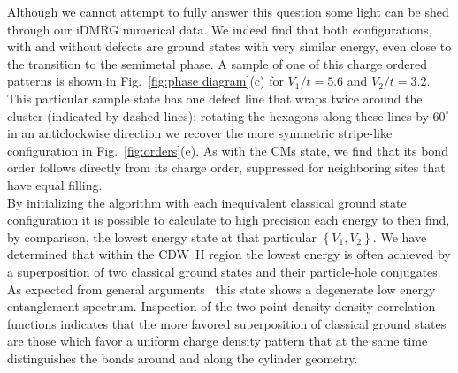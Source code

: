 \documentclass[aps,prx,10pt,twocolumn,floatfix,superscriptaddress,showpacs,numerical,footinbib]{revtex4-1}
\begin{document}
Although we cannot attempt to fully answer this question some light can be shed through our iDMRG numerical data. 
%
We indeed find that both configurations, with and without defects are ground states with very similar energy,
even close to the transition to the semimetal phase.
%
A sample of one of this charge ordered patterns is shown in Fig.~\ref{fig:phase diagram}(c) for $V_{1}/t=5.6$ and $V_{2}/t=3.2$.
%
This particular sample state has one defect line that wraps twice around the cluster (indicated by dashed lines); rotating the hexagons along these
lines by $60^{\circ}$ in an anticlockwise direction we recover the more symmetric stripe-like configuration in Fig.~\ref{fig:orders}(e).
%
As with the CMs state, we find that its bond order follows directly from its charge order, suppressed for neighboring sites that have
equal filling.\\
%
By initializing the algorithm with each inequivalent classical ground state configuration it is possible to calculate to high precision each 
energy to then find, by comparison, the lowest energy state at that particular $\left\lbrace V_{1},V_{2}\right\rbrace$.
%
We have determined that within the CDW~II region the lowest energy is often achieved by a superposition of two classical ground states
and their particle-hole conjugates.
%
As expected from general arguments~\cite{KZM13} this state shows a degenerate low energy entanglement spectrum.
%
Inspection of the two point density-density correlation functions indicates that 
the more favored superposition of classical ground states are those which favor a uniform charge density pattern that at the same time
distinguishes the bonds around and along the cylinder geometry.
%
\end{document}
